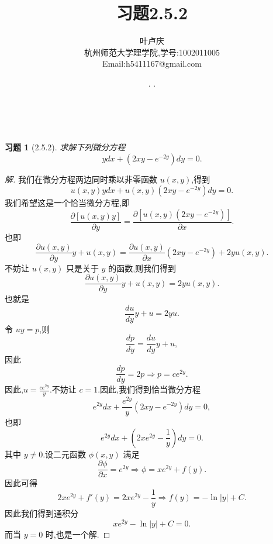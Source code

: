 \documentclass[a4paper, 12pt]{article} %
\makeatletter
\newtheorem*{cdtheorem}{习题}
\newenvironment{exercise}
{\bigskip\begin{mdframed}[backgroundcolor=gray!40,rightline=false,leftline=false,topline=false,bottomline=false]\begin{cdtheorem}}
    {\end{cdtheorem}\end{mdframed}\bigskip}
\renewcommand{\maketitle}{ %
  \renewcommand\refname{参考文献}
  \newcommand{\D}{\displaystyle}\newcommand{\ri}{\Rightarrow}
  \newcommand{\ds}{\displaystyle} \renewcommand{\ni}{\noindent}
  \newcommand{\pa}{\partial} \newcommand{\Om}{\Omega}
  \newcommand{\om}{\omega} \newcommand{\sik}{\sum_{i=1}^k}
  \newcommand{\vov}{\Vert\omega\Vert} \newcommand{\Umy}{U_{\mu_i,y^i}}
  \newcommand{\lamns}{\lambda_n^{^{\scriptstyle\sigma}}}
  \newcommand{\chiomn}{\chi_{_{\Omega_n}}}
  \newcommand{\ullim}{\underline{\lim}} \newcommand{\bsy}{\boldsymbol}
  \newcommand{\mvb}{\mathversion{bold}} \newcommand{\la}{\lambda}
  \newcommand{\La}{\Lambda} \newcommand{\va}{\varepsilon}
  \newcommand{\be}{\beta} \newcommand{\al}{\alpha}
  \newcommand{\dis}{\displaystyle} \newcommand{\R}{{\mathbb R}}
  \newcommand{\N}{{\mathbb N}} \newcommand{\cF}{{\mathcal F}}
  \newcommand{\gB}{{\mathfrak B}} \newcommand{\eps}{\epsilon}
  \begin{flushright} %
    {\LARGE\@title} %
    
    \vspace{50pt} %
    
    {\large\@author} %
    \\\@date %
    
    \vspace{40pt} %
  \end{flushright}
}
\makeatother
\begin{document}
\title{\textbf{习题2.5.2}} 
\author{\small{叶卢庆}\\{\small{杭州师范大学理学院,学号:1002011005}}\\{\small{Email:h5411167@gmail.com}}} %
\renewcommand{\today}{\number\year. \number\month. \number\day}
\date{\today} %



\maketitle %







\begin{exercise}[2.5.2]
求解下列微分方程
$$
ydx+(2xy-e^{-2y})dy=0.
$$
\end{exercise}
\begin{proof}[解]
我们在微分方程两边同时乘以非零函数 $u(x,y)$,得到
$$
u(x,y)ydx+u(x,y)(2xy-e^{-2y})dy=0.
$$
我们希望这是一个恰当微分方程,即
$$
\frac{\pa [u(x,y)y]}{\pa y}=\frac{\pa [u(x,y)(2xy-e^{-2y})]}{\pa x}.
$$
也即
$$
\frac{\pa u(x,y)}{\pa y}y+u(x,y)=\frac{\pa u(x,y)}{\pa
  x}(2xy-e^{-2y})+2y u(x,y).
$$
不妨让 $u(x,y)$ 只是关于 $y$  的函数,则我们得到
$$
\frac{\pa u(x,y)}{\pa y}y+u(x,y)=2yu(x,y).
$$
也就是
$$
\frac{du}{dy}y+u=2yu.
$$
令 $uy=p$,则
$$
\frac{dp}{dy}=\frac{du}{dy}y+u,
$$
因此
$$
\frac{dp}{dy}=2p\ri p=ce^{2y}.
$$
因此,$u=\frac{ce^{2y}}{y}$.不妨让 $c=1$.因此,我们得到恰当微分方程
$$
e^{2y}dx+\frac{e^{2y}}{y}(2xy-e^{-2y})dy=0,
$$
也即
$$
e^{2y}dx+(2xe^{2y}-\frac{1}{y})dy=0.
$$
其中 $y\neq 0$.设二元函数 $\phi(x,y)$ 满足
$$
\frac{\pa\phi}{\pa x}=e^{2y}\ri \phi=xe^{2y}+f(y).
$$
因此可得
$$
2xe^{2y}+f'(y)=2xe^{2y}-\frac{1}{y}\ri f(y)=-\ln |y|+C.
$$
因此我们得到通积分
$$
xe^{2y}-\ln|y|+C=0.
$$
而当 $y=0$ 时,也是一个解.
\end{proof}





\end{document}

